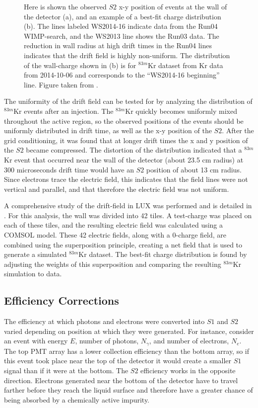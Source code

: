 \begin{figure}[!h]
\begin{subfigure}{0.5\linewidth}
\caption{}
\end{subfigure}
\caption{Here is shown the observed $S2$ x-y position of events at the wall of the detector (a), and an example of a best-fit charge distribution (b). The lines labeled WS2014-16 indicate data from the Run04 WIMP-search, and the WS2013 line shows the Run03 data. The reduction in wall radius at high drift times in the Run04 lines indicates that the drift field is highly non-uniform. The distribution of the wall-charge shown in (b) is for $^{83m}$Kr dataset from Kr data from 2014-10-06 and corresponds to the ``WS2014-16 beginning'' line. Figure taken from \cite{lux_efield}.}
\label{fig:lux_layout} 
\end{figure}

The uniformity of the drift field can be tested for by analyzing the distribution of $^{83m}$Kr events after an injection. The $^{83m}$Kr quickly becomes uniformly mixed throughout the active region, so the observed positions of the events should be uniformly distributed in drift time, as well as the x-y position of the $S2$. After the grid conditioning, it was found that at longer drift times the x and y position of the $S2$ became compressed. The distortion of the distribution indicated that a $^{83m}$Kr event that occurred near the wall of the detector (about 23.5 cm radius) at 300 microseconds drift time would have an $S2$ position of about 13 cm radius. Since electrons trace the electric field, this indicates that the field lines were not vertical and parallel, and that therefore the electric field was not uniform.

A comprehensive study of the drift-field in LUX was performed and is detailed in \cite{lux_efield}. For this analysis, the wall was divided into 42 tiles. A test-charge was placed on each of these tiles, and the resulting electric field was calculated using a COMSOL model. These 42 electric fields, along with a 0-charge field, are combined using the superposition principle, creating a net field that is used to generate a simulated $^{83m}$Kr dataset. The best-fit charge distribution is found by adjusting the weights of this superposition and comparing the resulting $^{83m}$Kr simulation to data.
 
 \subsection{Efficiency Corrections}\label{sec:krypcal}
The efficiency at which photons and electrons were converted into $S1$ and $S2$ varied depending on position at which they were generated. For instance, consider an event with energy $E$, number of photons, $N_{\gamma}$, and number of electrons, $N_e$. The top PMT array has a lower collection efficiency than the bottom array, so if this event took place near the top of the detector it would create a smaller $S1$ signal than if it were at the bottom. The $S2$ efficiency works in the opposite direction. Electrons generated near the bottom of the detector have to travel farther before they reach the liquid surface and therefore have a greater chance of being absorbed by a chemically active impurity. 

